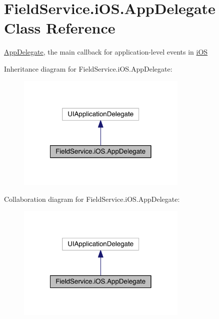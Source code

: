 \hypertarget{class_field_service_1_1i_o_s_1_1_app_delegate}{\section{Field\+Service.\+i\+O\+S.\+App\+Delegate Class Reference}
\label{class_field_service_1_1i_o_s_1_1_app_delegate}
}


\hyperlink{class_field_service_1_1i_o_s_1_1_app_delegate}{App\+Delegate}, the main callback for application-\/level events in \hyperlink{namespace_field_service_1_1i_o_s}{i\+O\+S}  




Inheritance diagram for Field\+Service.\+i\+O\+S.\+App\+Delegate\+:
\nopagebreak
\begin{figure}[H]
\begin{center}
\leavevmode
\includegraphics[width=230pt]{class_field_service_1_1i_o_s_1_1_app_delegate__inherit__graph}
\end{center}
\end{figure}


Collaboration diagram for Field\+Service.\+i\+O\+S.\+App\+Delegate\+:
\nopagebreak
\begin{figure}[H]
\begin{center}
\leavevmode
\includegraphics[width=230pt]{class_field_service_1_1i_o_s_1_1_app_delegate__coll__graph}
\end{center}
\end{figure}
